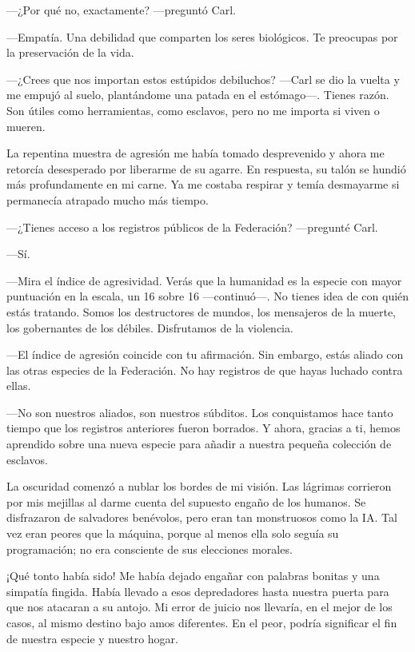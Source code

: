 —¿Por qué no, exactamente? —preguntó Carl.

—Empatía. Una debilidad que comparten los seres biológicos. Te preocupas por la preservación de la vida.

—¿Crees que nos importan estos estúpidos debiluchos? —Carl se dio la vuelta y me empujó al suelo, plantándome una patada en el estómago—. Tienes razón. Son útiles como herramientas, como esclavos, pero no me importa si viven o mueren.

La repentina muestra de agresión me había tomado desprevenido y ahora me retorcía desesperado por liberarme de su agarre. En respuesta, su talón se hundió más profundamente en mi carne. Ya me costaba respirar y temía desmayarme si permanecía atrapado mucho más tiempo.

 —¿Tienes acceso a los registros públicos de la Federación? —pregunté Carl.

—Sí.

—Mira el índice de agresividad. Verás que la humanidad es la especie con mayor puntuación en la escala, un 16 sobre 16 —continuó—. No tienes idea de con quién estás tratando. Somos los destructores de mundos, los mensajeros de la muerte, los gobernantes de los débiles. Disfrutamos de la violencia.

—El índice de agresión coincide con tu afirmación. Sin embargo, estás aliado con las otras especies de la Federación. No hay registros de que hayas luchado contra ellas.

—No son nuestros aliados, son nuestros súbditos. Los conquistamos hace tanto tiempo que los registros anteriores fueron borrados. Y ahora, gracias a ti, hemos aprendido sobre una nueva especie para añadir a nuestra pequeña colección de esclavos.

La oscuridad comenzó a nublar los bordes de mi visión. Las lágrimas corrieron por mis mejillas al darme cuenta del supuesto engaño de los humanos. Se disfrazaron de salvadores benévolos, pero eran tan monstruosos como la IA. Tal vez eran peores que la máquina, porque al menos ella solo seguía su programación; no era consciente de sus elecciones morales.

¡Qué tonto había sido! Me había dejado engañar con palabras bonitas y una simpatía fingida. Había llevado a esos depredadores hasta nuestra puerta para que nos atacaran a su antojo. Mi error de juicio nos llevaría, en el mejor de los casos, al mismo destino bajo amos diferentes. En el peor, podría significar el fin de nuestra especie y nuestro hogar.

